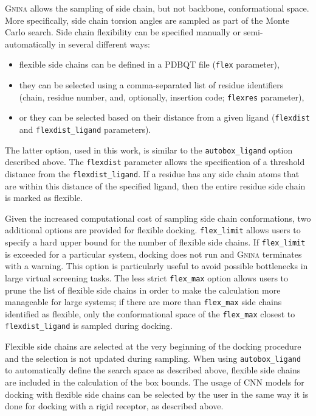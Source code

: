 \documentclass[journal=jcisd8,manuscript=article]{achemso}
\begin{document}
\textsc{Gnina} allows the sampling of side chain, but not backbone, conformational space. More specifically, side chain torsion angles are sampled as part of the Monte Carlo search. Side chain flexibility can be specified manually or semi-automatically in several different ways: 
\begin{itemize}
    \item flexible side chains can be defined in a PDBQT file (\texttt{flex} parameter),
    \item they can be selected using a comma-separated list of residue identifiers (chain, residue number, and, optionally, insertion code; \texttt{flexres} parameter),
    \item or they can be selected based on their distance from a given ligand (\texttt{flexdist} and \texttt{flexdist\_ligand} parameters).
\end{itemize}
The latter option, used in this work, is similar to the \texttt{autobox\_ligand} option described above. The \texttt{flexdist} parameter allows the specification of a threshold distance from the \texttt{flexdist\_ligand}. If a residue has any side chain atoms that are within this distance of the specified ligand, then the entire residue side chain is marked as flexible. 

Given the increased computational cost of sampling side chain conformations, two additional options are provided for flexible docking. \texttt{flex\_limit} allows users to specify a hard upper bound for the number of flexible side chains. If \texttt{flex\_limit} is exceeded for a particular system, docking does not run and \textsc{Gnina} terminates with a warning. This option is particularly useful to avoid possible bottlenecks in large virtual screening tasks. The less strict \texttt{flex\_max} option allows users to prune the list of flexible side chains in order to make the calculation more manageable for large systems; if there are more than \texttt{flex\_max} side chains identified as flexible, only the conformational space of the \texttt{flex\_max} closest to \texttt{flexdist\_ligand} is sampled during docking.

Flexible side chains are selected at the very beginning of the docking procedure and the selection is not updated during sampling. When using \texttt{autobox\_ligand} to automatically define the search space as described above, flexible side chains are included in the calculation of the box bounds. The usage of CNN models for docking with flexible side chains can be selected by the user in the same way it is done for docking with a rigid receptor, as described above.
\end{document}
